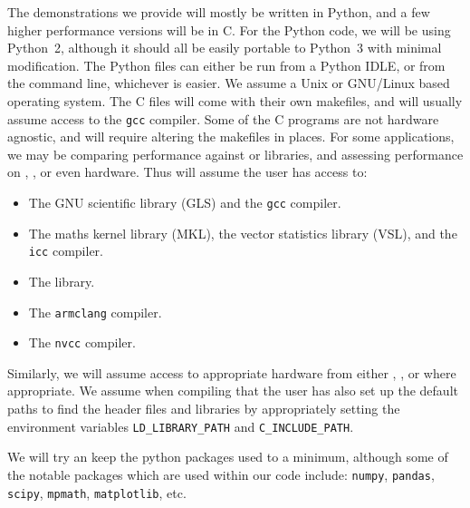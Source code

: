 \documentclass[11pt,a4paper,oneside,english]{extarticle}
\begin{document}
The demonstrations we provide will mostly be written in Python, and a few higher performance versions will be in C. For the Python code, we will be using Python~2, although it should all be easily portable to Python~3 with minimal modification. The Python files can either be run from a Python IDLE, or from the command line, whichever is easier. We assume a Unix or GNU/Linux based operating system. The C files will come with their own makefiles, and will usually assume access to the \texttt{gcc} compiler. Some of the C programs are not hardware agnostic, and will require altering the makefiles in places. For some applications, we may be comparing performance against \intel or \nag libraries, and assessing performance on \intel, \arm, or even \nvidia hardware. Thus will assume the user has access to:
\begin{itemize}
\item The GNU scientific library (GLS) and the \texttt{gcc} compiler.
\item The \intel maths kernel library (MKL), the vector statistics library (VSL), and the \texttt{icc} compiler. 
\item The \nag library. 
\item The \arm \texttt{armclang} compiler.
\item The \nvidia \texttt{nvcc} compiler.
\end{itemize} 
Similarly, we will assume access to appropriate hardware from either \intel, \arm, or \nvidia where appropriate. We assume when compiling that the user has also set up the default paths to find the header files and libraries by appropriately setting the environment variables \verb|LD_LIBRARY_PATH| and \verb|C_INCLUDE_PATH|.

We will try an keep the python packages used to a minimum, although some of the notable packages which are used within our code include: \texttt{numpy}, \texttt{pandas}, \texttt{scipy}, \texttt{mpmath}, \texttt{matplotlib}, etc. 
\end{document}
